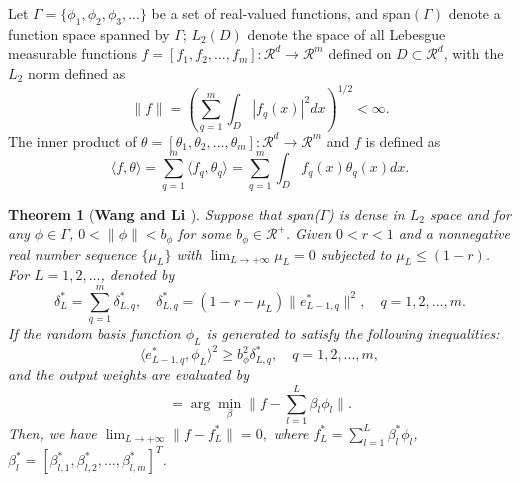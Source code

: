 \documentclass{article}
\newtheorem{theorem}{Theorem}
\begin{document}
Let $\Gamma=\{\phi_1, \phi_2, \phi_3,...\}$ be a set of real-valued functions, and span$(\Gamma)$ denote a function space spanned by $\Gamma$; $L_{2}(D)$ denote the space of all Lebesgue measurable functions $f=[f_1,f_2,\ldots,f_m]:\mathcal{R}^{d}\rightarrow \mathcal{R}^{m}$ defined on $D\subset \mathcal{R}^{d}$, with the $L_2$ norm defined as
\begin{equation}\label{multiple_lp}
  \|f\|=\left(\sum_{q=1}^{m}\int_{D}|f_q(x)|^2dx\right)^{1/2}<\infty.
\end{equation}
The inner product of $\theta=[\theta_1,\theta_2,\ldots,\theta_m]:\mathcal{R}^{d}\rightarrow \mathcal{R}^{m}$ and $f$ is defined as
\begin{equation}\label{multiple_inner}
  \langle f,\theta\rangle=\sum_{q=1}^{m}\langle f_q,\theta_q\rangle=\sum_{q=1}^{m}\int_{D}f_q(x)\theta_q(x)dx.
\end{equation}
\begin{theorem}[\textbf{Wang and Li \cite{WangandLi_SCN}}] 
\label{TH01}
Suppose that span($\Gamma$) is dense in $L_2$ space and for any $\phi \in \Gamma$,  $0 <\| \phi \|<b_{\phi} $ for some $b_{\phi}\in \mathcal{R}^{+}$. Given $0<r<1$ and a nonnegative real number sequence $\{\mu_L\}$ with $\lim_{L\rightarrow+\infty}\mu_L=0$ subjected to $\mu_L\leq (1-r)$.  
For $L=1,2,\ldots$, denoted by
\begin{equation}
\delta_{L}^{*}=\sum_{q=1}^{m}\delta_{L,q}^{*},\quad \delta_{L,q}^{*}=(1-r-\mu_L)\|e_{L-1,q}^{*}\|^2,\quad q=1,2,...,m.
\end{equation}
If the random basis function $\phi_L$ is generated to satisfy the following inequalities:
\begin{equation}
\langle e_{L-1,q}^{*},\phi_L\rangle^2\geq b_{\phi}^2\delta_{L,q}^{*}, \quad q=1,2,...,m,
\end{equation}
and the output weights are evaluated by
\begin{equation}
[\beta_1^{*}, \beta_2^{*},\ldots,\beta_{L}^{*}]=\arg \min_{\beta}\|f-\sum_{l=1}^{L}\beta_l \phi_l\|.
\end{equation}
Then, we have $\lim_{L\rightarrow +\infty}\|f-f_L^{*}\|=0,$ where $f_L^{*}=\sum_{l=1}^{L}\beta_{l}^{*}\phi_l$, $\beta_{l}^{*}=[\beta^{*}_{l,1},\beta^{*}_{l,2},\ldots,\beta^{*}_{l,m}]^{T}$.
\end{theorem} 
\end{document}
